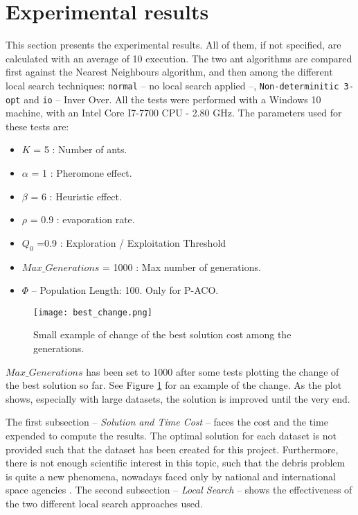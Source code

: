 \documentclass[a4paper,9pt,journal,twoside,compsoc]{PPIEEEtran}
\begin{document}

\section{Experimental results}
This section presents the experimental results. All of them, if not specified, are calculated with an average of 10 execution. The two ant algorithms are compared first against the Nearest Neighbours algorithm, and then among the different local search techniques: \texttt{normal} -- no local search applied --, \texttt{Non-determinitic 3-opt} and \texttt{io} -- Inver Over. All the tests were performed with a Windows 10 machine, with an Intel Core I7-7700 CPU - 2.80 GHz.
The parameters used for these tests are:

\begin{itemize}
\item $K$ = 5 : Number of ants.
\item $\alpha$ = 1 : Pheromone effect.  
\item $\beta$ = 6 : Heuristic effect.
\item $\rho$ = 0.9 : evaporation rate.
\item $Q_0$ =0.9 : Exploration / Exploitation Threshold
\item $Max\_Generations$ = 1000 : Max number of generations.
\item $\Phi$ -- Population Length: 100. Only for P-ACO.
\end{itemize}

\begin{figure}[!h]
\centering
\texttt{[image: best\_change.png]}
\caption{Small example of change of the best solution cost among the generations.}
\label{fig:best_change}
\end{figure}

$Max\_Generations$ has been set to 1000 after some tests plotting the change of the best solution so far. See Figure \ref{fig:best_change} for an example of the change. As the plot shows, especially with large datasets, the solution is improved until the very end.

The first subsection -- \textit{Solution and Time Cost} -- faces the cost and the time expended to compute the results. The optimal solution for each dataset is not provided such that the dataset has been created for this project. Furthermore, there is not enough scientific interest in this topic, such that the debris problem is quite a new phenomena, nowadays faced only by national and international space agencies \cite{esadeb} \cite{nasadeb}.
The second subsection -- \textit{Local Search} -- shows the effectiveness of the two different local search approaches used.
\end{document}

